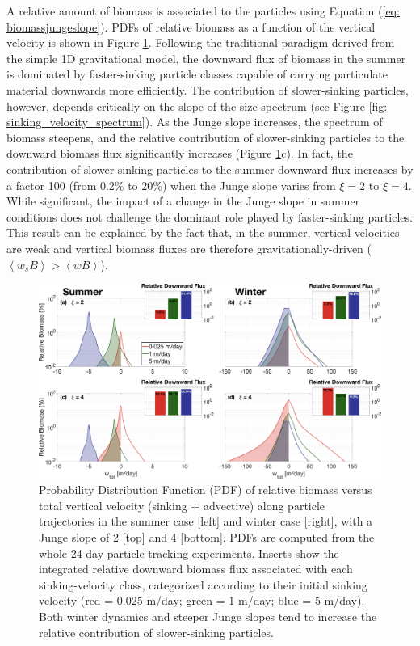 \documentclass[article,linenumbers]{agujournal2019}
\begin{document}
	A relative amount of biomass is associated to the particles using Equation (\ref{eq: biomassjungeslope}). PDFs of relative biomass as a function of the vertical velocity is shown in Figure \ref{fig: biomass_export}. Following the traditional paradigm derived from the simple 1D gravitational model, the downward flux of biomass in the summer is dominated by faster-sinking particle classes capable of carrying particulate material downwards more efficiently. The contribution of slower-sinking particles, however, depends critically on the slope of the size spectrum (see Figure \ref{fig: sinking_velocity_spectrum}). As the Junge slope increases, the spectrum of biomass steepens, and the relative contribution of slower-sinking particles to the downward biomass flux significantly increases (Figure \ref{fig: biomass_export}c). In fact, the contribution of slower-sinking particles to the summer downward flux increases by a factor 100 (from 0.2\% to 20\%) when the Junge slope varies from $\xi =2$ to $\xi = 4$. While significant, the impact of a change in the Junge slope in summer conditions does not challenge the dominant role played by faster-sinking particles. This result can be explained by the fact that, in the summer, vertical velocities are weak and vertical biomass fluxes are therefore gravitationally-driven ($\left<w_sB\right> > \left<wB\right>$).

	\begin{figure}[t]
		\centering
		\includegraphics[width = 1\linewidth]{Fig7.png}
		\caption{Probability Distribution Function (PDF) of relative biomass versus total vertical velocity (sinking + advective) along particle trajectories in the summer case [left] and winter case [right], with a Junge slope of 2 [top] and 4 [bottom]. PDFs are computed from the whole 24-day particle tracking experiments. Inserts show the integrated relative downward biomass flux associated with each sinking-velocity class, categorized according to their initial sinking velocity (red = 0.025 m/day; green = 1 m/day; blue = 5 m/day). Both winter dynamics and steeper Junge slopes tend to increase the relative contribution of slower-sinking particles.}
		\label{fig: biomass_export}
	\end{figure}
\end{document}
